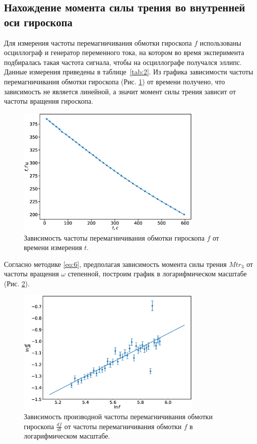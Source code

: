 \documentclass[12pt]{article}
\begin{document}
\subsection{Нахождение момента силы трения во внутренней оси гироскопа}
Для измерения частоты перемагничивания обмотки гироскопа $f$ использованы осциллограф и генератор переменного тока, 
на котором во время эксперимента подбиралась такая частота сигнала, чтобы на осциллографе получался эллипс. Данные измерения приведены в 
таблице~\ref{tab:2}. Из графика зависимости частоты перемагничивания обмотки гироскопа (Рис. \ref{fig:3}) от времени получено, что зависимость не является 
линейной, а значит момент силы трения зависит от частоты вращения гироскопа.
\begin{figure}[H]
    \begin{center}
        \includegraphics[width=0.8\textwidth]{2.eps}
    \end{center}
    \caption{Зависимость частоты перемагничивания обмотки гироскопа $f$ от времени измерения $t$.}
    \label{fig:3}
\end{figure}
Согласно методике \ref{eq:6}, предполагая зависимость момента силы трения $Mtr_3$ от частоты вращения $\omega$ степенной, построим график в логарифмическом
масштабе (Рис. \ref{fig:4}).
\begin{figure}[H]
    \begin{center}
        \includegraphics[width=0.8\textwidth]{3.eps}
    \end{center}
    \caption{Зависимость производной частоты перемагничивания обмотки гироскопа $\frac{df}{dt}$ от частоты перемагничивания обмотки $f$ 
    в логарифмическом масштабе.}
    \label{fig:4}
\end{figure}
\end{document}
